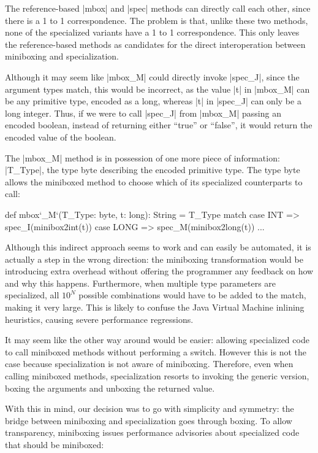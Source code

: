 The reference-based |mbox| and |spec| methods can directly call each other, since there is a 1 to 1 correspondence. The problem is that, unlike these two methods, none of the specialized variants have a 1 to 1 correspondence. This only leaves the reference-based methods as candidates for the direct interoperation between miniboxing and specialization.

Although it may seem like |mbox_M| could directly invoke |spec_J|, since the argument types match, this would be incorrect, as the value |t| in |mbox_M| can be any primitive type, encoded as a long, whereas |t| in |spec_J| can only be a long integer. Thus, if we were to call |spec_J| from |mbox_M| passing an encoded boolean, instead of returning either ``true'' or ``false'', it would return the encoded value of the boolean.

The |mbox_M| method is in possession of one more piece of information: |T_Type|, the type byte describing the encoded primitive type. The type byte allows the miniboxed method to choose which of its specialized counterparts to call:

\begin{lstlisting-nobreak}
 def mbox`_M`(T_Type: byte, t: long): String =
   T_Type match {
     case INT     => spec_I(minibox2int(t))
     case LONG => spec_M(minibox2long(t))
     ...
   }
\end{lstlisting-nobreak}

Although this indirect approach seems to work and can easily be automated, it is actually a  step in the wrong direction: the miniboxing transformation would be introducing extra overhead without offering the programmer any feedback on how and why this happens. Furthermore, when multiple type parameters are specialized, all $10^N$ possible combinations would have to be added to the match, making it very large. This is likely to confuse the Java Virtual Machine inlining heuristics, causing severe performance regressions.

It may seem like the other way around would be easier: allowing specialized code to call miniboxed methods without performing a switch. However this is not the case because specialization is not aware of miniboxing. Therefore, even when calling miniboxed methods, specialization resorts to invoking the generic version, boxing the arguments and unboxing the returned value.

With this in mind, our decision was to go with simplicity and symmetry: the bridge between miniboxing and specialization goes through boxing. To allow transparency, miniboxing issues performance advisories about specialized code that should be miniboxed:

